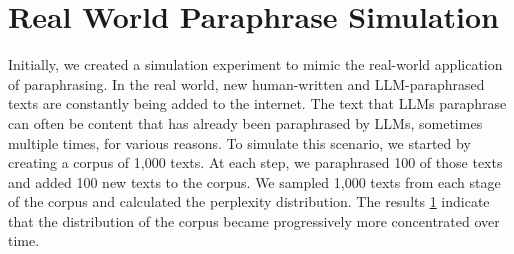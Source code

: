 \section{Real World Paraphrase Simulation}
Initially, we created a simulation experiment to mimic the real-world application of paraphrasing.
In the real world, new human-written and LLM-paraphrased texts are constantly being added to the internet. The text that LLMs paraphrase can often be content that has already been paraphrased by LLMs, sometimes multiple times, for various reasons.
To simulate this scenario, we started by creating a corpus of 1,000 texts. 
At each step, we paraphrased 100 of those texts and added 100 new texts to the corpus.
We sampled 1,000 texts from each stage of the corpus and calculated the perplexity distribution. 
The results \ref{} indicate that the distribution of the corpus became progressively more concentrated over time.









                                                                                                                                                                  